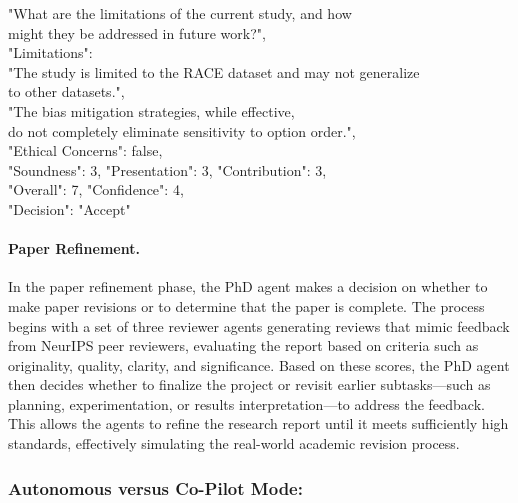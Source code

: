 \documentclass[11pt, a4paper]{gdm_format}
\newcommand{\blank}[1]{\hspace*{#1}\linebreak[0]}
\begin{document}
\begin{tcolorbox}[breakable,colback=blue!5!white, colframe=blue!70!black, title=Example Review ( o1-mini | Word Order Sensitivity )]
{	\blank{1cm} "What are the limitations of the current study, and how\\\blank{1cm}  might they be addressed in future work?"\text{]},\\
"Limitations": \text{[}\\
	\blank{1cm} "The study is limited to the RACE dataset and may not generalize\\\blank{1cm}  to other datasets.",\\
	\blank{1cm} "The bias mitigation strategies, while effective,\\\blank{1cm}  do not completely eliminate sensitivity to option order."\text{]},\\
	"Ethical Concerns": false,\\
	"Soundness": 3, "Presentation": 3, "Contribution": 3, \\"Overall": 7, "Confidence": 4, \\"Decision": "Accept"
}
\end{tcolorbox}


\paragraph{Paper Refinement.}  In the paper refinement phase, the PhD agent makes a decision on whether to make paper revisions or to determine that the paper is complete. The process begins with a set of three reviewer agents generating reviews that mimic feedback from NeurIPS peer reviewers, evaluating the report based on criteria such as originality, quality, clarity, and significance. Based on these scores, the PhD agent then decides whether to finalize the project or revisit earlier subtasks—such as planning, experimentation, or results interpretation—to address the feedback. This allows the agents to refine the research report until it meets sufficiently high standards, effectively simulating the real-world academic revision process.

\subsubsection{Autonomous versus Co-Pilot Mode:} 
\label{sec:auto_vs_copilot}
\end{document}
